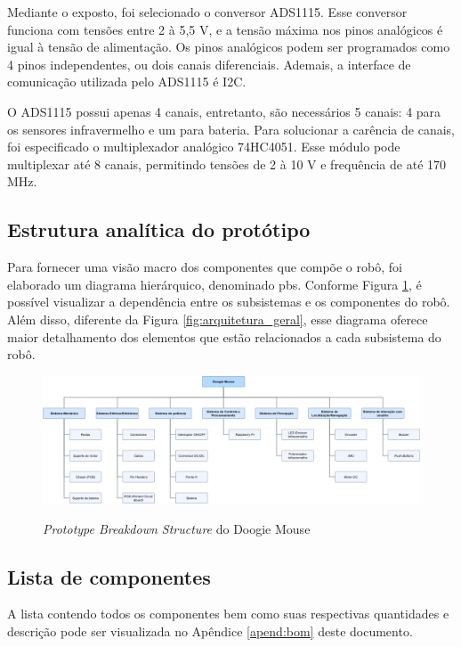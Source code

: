 Mediante o exposto, foi selecionado o conversor ADS1115. Esse conversor funciona com tensões entre 2 à 5,5 V, e a tensão máxima nos pinos analógicos é igual à tensão de alimentação. Os pinos analógicos podem ser programados como 4 pinos independentes, ou dois canais diferenciais. Ademais, a interface de comunicação utilizada pelo ADS1115 é I2C.

O ADS1115 possui apenas 4 canais, entretanto, são necessários 5 canais: 4 para os sensores infravermelho e um para bateria. Para solucionar a carência de canais, foi especificado o multiplexador analógico 74HC4051. Esse módulo pode multiplexar até 8 canais, permitindo tensões de 2 à 10 V e frequência de até 170 MHz.

\subsection{Estrutura analítica do protótipo}
\label{ssec:pbs}
Para fornecer uma visão macro dos componentes que compõe o robô, foi elaborado um diagrama hierárquico, denominado \gls*{pbs}. Conforme Figura \ref{fig:pbs}, é possível visualizar a dependência entre os subsistemas e os componentes do robô. Além disso, diferente da Figura \ref{fig:arquitetura_geral}, esse diagrama oferece maior detalhamento dos elementos que estão relacionados a cada subsistema do robô.

\begin{figure}[H]
	\centering
	\caption{\textit{Prototype Breakdown Structure} do Doogie Mouse}
	\includegraphics[width=1\textwidth]
	{Figures/prototype_breakdown_structure}
	\label{fig:pbs}
\end{figure}

\subsection{Lista de componentes}
\label{ssec:bom}
A lista contendo todos os componentes bem como suas respectivas quantidades e descrição pode ser visualizada no Apêndice \ref{apend:bom} deste documento.


